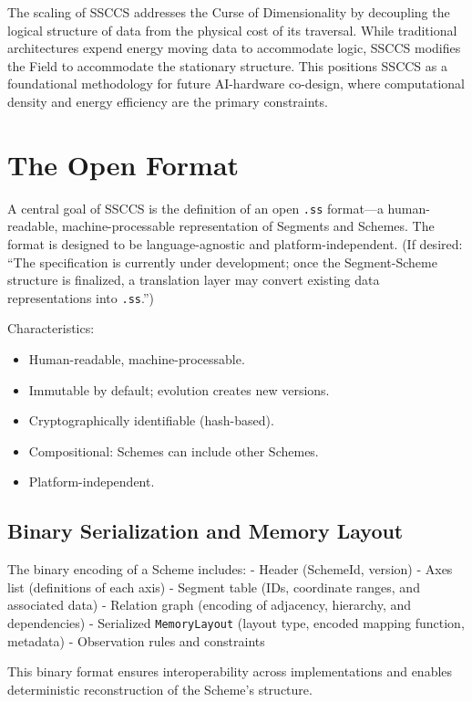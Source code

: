 \documentclass[
  a4paper,
  DIV=11,
  numbers=noendperiod]{scrartcl}
\providecommand{\tightlist}{%
  \setlength{\itemsep}{0pt}\setlength{\parskip}{0pt}}
\begin{document}
The scaling of SSCCS addresses the Curse of Dimensionality by decoupling
the logical structure of data from the physical cost of its traversal.
While traditional architectures expend energy moving data to accommodate
logic, SSCCS modifies the Field to accommodate the stationary structure.
This positions SSCCS as a foundational methodology for future
AI-hardware co-design, where computational density and energy efficiency
are the primary constraints.

\section{The Open Format}\label{the-open-format}

A central goal of SSCCS is the definition of an open \texttt{.ss}
format---a human-readable, machine-processable representation of
Segments and Schemes. The format is designed to be language-agnostic and
platform-independent. (If desired: ``The specification is currently
under development; once the Segment-Scheme structure is finalized, a
translation layer may convert existing data representations into
\texttt{.ss}.'')

Characteristics:

\begin{itemize}
\tightlist
\item
  Human-readable, machine-processable.
\item
  Immutable by default; evolution creates new versions.
\item
  Cryptographically identifiable (hash-based).
\item
  Compositional: Schemes can include other Schemes.
\item
  Platform-independent.
\end{itemize}

\subsection{Binary Serialization and Memory
Layout}\label{binary-serialization-and-memory-layout}

The binary encoding of a Scheme includes: - Header (SchemeId, version) -
Axes list (definitions of each axis) - Segment table (IDs, coordinate
ranges, and associated data) - Relation graph (encoding of adjacency,
hierarchy, and dependencies) - Serialized \texttt{MemoryLayout} (layout
type, encoded mapping function, metadata) - Observation rules and
constraints

This binary format ensures interoperability across implementations and
enables deterministic reconstruction of the Scheme's structure.
\end{document}
